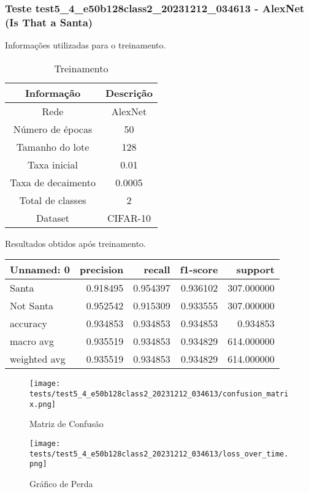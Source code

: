 \subsubsection{Teste test5_4_e50b128class2_20231212_034613 - AlexNet (Is That a Santa)}

Informações utilizadas para o treinamento.

\begin{table}[ht]
   \centering
   \caption{Treinamento}
   \label{tab:modelos}
   \begin{tabular}{| c | c | }
      \hline 
      \textbf{Informação} & \textbf{Descrição} \\
      \hline \hline 
      Rede & AlexNet \\
      \hline
      Número de épocas & 50\\
      \hline
      Tamanho do lote & 128\\
      \hline
      Taxa inicial & 0.01 \\
      \hline
      Taxa de decaimento & 0.0005 \\
      \hline
      Total de classes & 2\\
      \hline
      Dataset & CIFAR-10\\
      \hline
   \end{tabular} 
\end{table}

Resultados obtidos após treinamento.

\begin{tabular}{lrrrr}
\toprule
  Unnamed: 0 &  precision &   recall &  f1-score &    support \\
\midrule
       Santa &   0.918495 & 0.954397 &  0.936102 & 307.000000 \\
   Not Santa &   0.952542 & 0.915309 &  0.933555 & 307.000000 \\
    accuracy &   0.934853 & 0.934853 &  0.934853 &   0.934853 \\
   macro avg &   0.935519 & 0.934853 &  0.934829 & 614.000000 \\
weighted avg &   0.935519 & 0.934853 &  0.934829 & 614.000000 \\
\bottomrule
\end{tabular}


\begin{figure}[ht]
 \begin{center}
   \texttt{[image: tests/test5\_4\_e50b128class2\_20231212\_034613/confusion\_matrix.png]}
  \caption{Matriz de Confusão}
  \label{fig:fig03}
 \end{center}
\end{figure}

\begin{figure}[ht]
 \begin{center}
   \texttt{[image: tests/test5\_4\_e50b128class2\_20231212\_034613/loss\_over\_time.png]}
  \caption{Gráfico de Perda}
  \label{fig:fig04}
 \end{center}
\end{figure}

